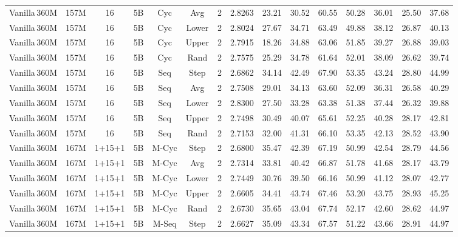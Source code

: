 \begin{table}[h!]
{\begin{tabular}{l|ccc|ccc|c|cccccc|c}
    Vanilla\,360M & 157M & 16 & 5B & Cyc  & Avg & 2  & 2.8263 & 23.21 & 30.52 & 60.55 & 50.28 & 36.01 & 25.50 & 37.68  \\
    Vanilla\,360M & 157M & 16 & 5B & Cyc  & Lower & 2  & 2.8024 & 27.67 & 34.71 & 63.49 & 49.88 & 38.12 & 26.87 & 40.13  \\
    Vanilla\,360M & 157M & 16 & 5B & Cyc  & Upper & 2  & 2.7915 & 18.26 & 34.88 & 63.06 & 51.85 & 39.27 & 26.88 & 39.03  \\
    Vanilla\,360M & 157M & 16 & 5B & Cyc  & Rand & 2  & 2.7575 & 25.29 & 34.78 & 61.64 & 52.01 & 38.09 & 26.62 & 39.74   \\
    \midrule
     \rowcolor[gray]{0.9}
    Vanilla\,360M & 157M & 16 & 5B & Seq  & Step & 2  & 2.6862 & 34.14 & 42.49 & 67.90 & 53.35 & 43.24 & 28.80 & 44.99  \\
    Vanilla\,360M & 157M & 16 & 5B & Seq  & Avg & 2  & 2.7508 & 29.01 & 34.13 & 63.60 & 52.09 & 36.31 & 26.58 & 40.29  \\
    Vanilla\,360M & 157M & 16 & 5B & Seq  & Lower & 2  & 2.8300 & 27.50 & 33.28 & 63.38 & 51.38 & 37.44 & 26.32 & 39.88  \\
    Vanilla\,360M & 157M & 16 & 5B & Seq  & Upper & 2  & 2.7498 & 30.49 & 40.07 & 65.61 & 52.25 & 40.28 & 28.17 & 42.81  \\
    Vanilla\,360M & 157M & 16 & 5B & Seq  & Rand & 2  & 2.7153 & 32.00 & 41.31 & 66.10 & 53.35 & 42.13 & 28.52 & 43.90   \\
    \midrule
    Vanilla\,360M & 167M & 1+15+1 & 5B & M-Cyc  & Step & 2  & 2.6800 & 35.47 & 42.39 & 67.19 & 50.99 & 42.54 & 28.79 & 44.56  \\
    Vanilla\,360M & 167M & 1+15+1 & 5B & M-Cyc  & Avg & 2  & 2.7314 & 33.81 & 40.42 & 66.87 & 51.78 & 41.68 & 28.17 & 43.79  \\
    Vanilla\,360M & 167M & 1+15+1 & 5B & M-Cyc  & Lower & 2  & 2.7449 & 30.76 & 39.50 & 66.16 & 50.99 & 41.12 & 28.07 & 42.77  \\
     \rowcolor[gray]{0.9}
    Vanilla\,360M & 167M & 1+15+1 & 5B & M-Cyc  & Upper & 2  & 2.6605 & 34.41 & 43.74 & 67.46 & 53.20 & 43.75 & 28.93 & 45.25  \\
    Vanilla\,360M & 167M & 1+15+1 & 5B & M-Cyc  & Rand & 2  & 2.6730 & 35.65 & 43.04 & 67.74 & 52.17 & 42.60 & 28.62 & 44.97  \\
    \midrule
     \rowcolor[gray]{0.9}
    Vanilla\,360M & 167M & 1+15+1 & 5B & M-Seq  & Step & 2  & 2.6627 & 35.09 & 43.34 & 67.57 & 51.22 & 43.66 & 28.91 & 44.97  \\

\end{tabular}}
\end{table}
